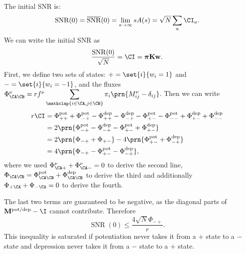 \documentclass[12pt]{article}
\newcommand{\eqm}{\pi}
\newcommand{\eq}{\boldsymbol{\eqm}}
\newcommand{\wm}{w}
\newcommand{\w}{\mathbf{\wm}}
\newcommand{\MMdm}{M}
\newcommand{\MMd}{\mathbf{\MMdm}}
\newcommand{\encm}{K}
\newcommand{\enc}{\mathbf{\encm}}
\newcommand{\Fm}{\Phi}
\newcommand{\pot}{^{\text{pot}}}
\newcommand{\dep}{^{\text{dep}}}
\newcommand{\potdep}{^{\text{pot/dep}}}
\DeclareMathOperator{\SNR}{SNR}
\DeclareMathOperator{\snr}{SNR}
\newcommand{\snrb}{\overline{\snr}}
\begin{document}
The initial SNR is:
%
\begin{equation}\label{eq:initdef}
  \snr(0) = \snrb(0) = \lim_{s\to\infty} sA(s)
      = \sqrt{N} \sum_a \CI_a.
\end{equation}
%
We can write the initial SNR as
%
\begin{equation*}
  \frac{\SNR(0)}{\sqrt{N}} = \CI = \eq \enc \w.
\end{equation*}
%
First, we define two sets of states: \( + = \set{i}{\wm_i = 1} \) and \( - = \set{i}{\wm_i = - 1} \), and the fluxes \( \Fm^\nu_{\CA \CB} = r f^\nu \displaystyle\sum_{\mathclap{i \in \CA, j \in \CB}} \eqm_i \prn{\MMdm^\nu_{ij} - \delta_{ij}} \).
Then we can write
%
\begin{equation*}
\begin{aligned}
  r\CI &= \Fm\pot_{++} + \Fm\pot_{-+} - \Fm\dep_{++} - \Fm\dep_{-+} - \Fm\pot_{+-} - \Fm\pot_{--} + \Fm\dep_{+-} + \Fm\dep_{--} \\
      &= 2\prn{\Fm\pot_{-+} - \Fm\dep_{-+} - \Fm\pot_{+-} + \Fm\dep_{+-}} \\
      &= 2\prn{\Fm_{-+} + \Fm_{+-}} - 4\prn{\Fm\pot_{+-} + \Fm\dep_{-+}} \\
      &= 4\prn{\Fm_{-+} - \Fm\pot_{+-} - \Fm\dep_{-+}}, \\
\end{aligned}
\end{equation*}
%
where we used \( \Fm^\nu_{\CA+} + \Fm^\nu_{\CA-} = 0 \) to derive the second line, \( \Fm_{\CA\CB} = \Fm\pot_{\CA\CB} + \Fm\dep_{\CA\CB} \) to derive the third and additionally \( \Fm_{+\CA} + \Fm_{-\CA} = 0 \) to derive the fourth.

The last two terms are guaranteed to be negative, as the diagonal parts of \(\MMd \potdep - \I\) cannot contribute.
Therefore
%
\begin{equation}\label{eq:initfluxineq}
  \SNR(0) \leq \frac{4\sqrt{N}\Fm_{-+}}{r}.
\end{equation}
%
This inequality is saturated if potentiation never takes it from a \(+\) state to a \(-\) state and depression never takes it from a \(-\) state to a \(+\) state.
\end{document}
